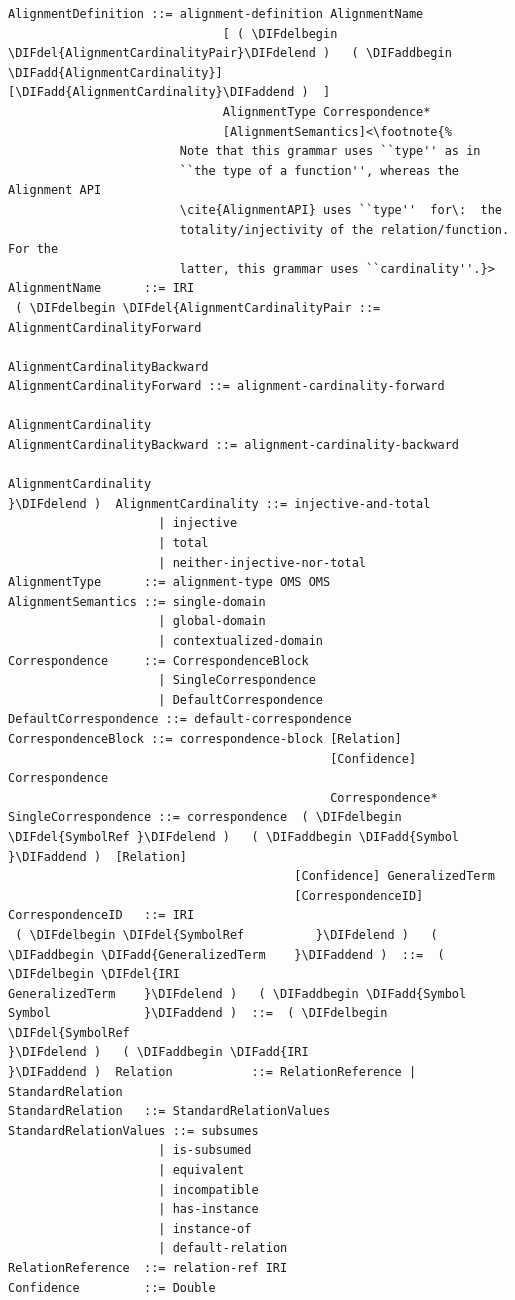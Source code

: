 \documentclass[10pt,fleqn,final]{scrreprt}
\providecommand{\DIFadd}[1]{{\protect\color{blue}\uwave{#1}}} %
\providecommand{\DIFdel}[1]{{\protect\color{red}\sout{#1}}}                      %
\providecommand{\DIFaddbegin}{} %
\providecommand{\DIFaddend}{} %
\providecommand{\DIFdelbegin}{} %
\providecommand{\DIFdelend}{} %
\begin{document}
\begin{lstlisting}[language=ebnf,escapeinside={()},mathescape]  %DIF >  abstract syntax
AlignmentDefinition ::= alignment-definition AlignmentName
                              [ ( \DIFdelbegin \DIFdel{AlignmentCardinalityPair}\DIFdelend )   ( \DIFaddbegin \DIFadd{AlignmentCardinality}] [\DIFadd{AlignmentCardinality}\DIFaddend )  ]
                              AlignmentType Correspondence*
                              [AlignmentSemantics]<\footnote{%
                        Note that this grammar uses ``type'' as in
                        ``the type of a function'', whereas the Alignment API
                        \cite{AlignmentAPI} uses ``type''  for\:  the
                        totality/injectivity of the relation/function.  For the
                        latter, this grammar uses ``cardinality''.}>
AlignmentName      ::= IRI
 ( \DIFdelbegin \DIFdel{AlignmentCardinalityPair ::= AlignmentCardinalityForward
                                                         AlignmentCardinalityBackward
AlignmentCardinalityForward ::= alignment-cardinality-forward
                                                              AlignmentCardinality
AlignmentCardinalityBackward ::= alignment-cardinality-backward
                                                                AlignmentCardinality
}\DIFdelend )  AlignmentCardinality ::= injective-and-total
                     | injective
                     | total
                     | neither-injective-nor-total
AlignmentType      ::= alignment-type OMS OMS
AlignmentSemantics ::= single-domain
                     | global-domain
                     | contextualized-domain
Correspondence     ::= CorrespondenceBlock
                     | SingleCorrespondence
                     | DefaultCorrespondence
DefaultCorrespondence ::= default-correspondence
CorrespondenceBlock ::= correspondence-block [Relation]
                                             [Confidence] Correspondence
                                             Correspondence*
SingleCorrespondence ::= correspondence  ( \DIFdelbegin \DIFdel{SymbolRef }\DIFdelend )   ( \DIFaddbegin \DIFadd{Symbol }\DIFaddend )  [Relation]
                                        [Confidence] GeneralizedTerm
                                        [CorrespondenceID]
CorrespondenceID   ::= IRI
 ( \DIFdelbegin \DIFdel{SymbolRef          }\DIFdelend )   ( \DIFaddbegin \DIFadd{GeneralizedTerm    }\DIFaddend )  ::=  ( \DIFdelbegin \DIFdel{IRI
GeneralizedTerm    }\DIFdelend )   ( \DIFaddbegin \DIFadd{Symbol
Symbol             }\DIFaddend )  ::=  ( \DIFdelbegin \DIFdel{SymbolRef
}\DIFdelend )   ( \DIFaddbegin \DIFadd{IRI
}\DIFaddend )  Relation           ::= RelationReference | StandardRelation
StandardRelation   ::= StandardRelationValues
StandardRelationValues ::= subsumes
                     | is-subsumed
                     | equivalent
                     | incompatible
                     | has-instance
                     | instance-of
                     | default-relation
RelationReference  ::= relation-ref IRI
Confidence         ::= Double
\end{lstlisting}
\end{document}
